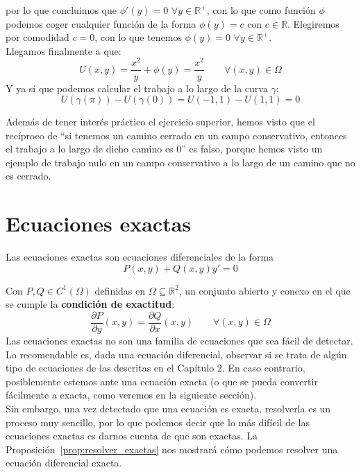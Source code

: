 \begin{ejercicio*}
    por lo que concluimos que $\phi'(y) = 0$ $\forall y\in \mathbb{R}^+$, con lo que como función $\phi$ podemos coger cualquier función de la forma $\phi(y) = c$ con $c\in \mathbb{R}$. Elegiremos por comodidad $c=0$, con lo que tenemos $\phi(y) = 0$ $\forall y\in \mathbb{R}^+$.\\

    Llegamos finalmente a que:
    \begin{equation*}
        U(x,y) = \dfrac{x^2}{y} + \phi(y) = \dfrac{x^2}{y} \qquad \forall (x,y)\in \Omega
    \end{equation*}
    Y ya sí que podemos calcular el trabajo a lo largo de la curva $\gamma$:
    \begin{equation*}
        U(\gamma(\pi)) - U(\gamma(0)) = U(-1,1) - U(1,1) = 0
    \end{equation*}
\end{ejercicio*}
Además de tener interés práctico el ejercicio superior, hemos visto que el recíproco de ``si tenemos un camino cerrado en un campo conservativo, entonces el trabajo a lo largo de dicho camino es 0'' es falso, porque hemos visto un ejemplo de trabajo nulo en un campo conservativo a lo largo de un camino que no es cerrado.

\section{Ecuaciones exactas}
Las ecuaciones exactas son ecuaciones diferenciales de la forma
\begin{equation}\label{eq:exacta}
    P(x,y)+Q(x,y)y' = 0
\end{equation}

Con $P,Q\in C^1(\Omega)$ definidas en $\Omega\subseteq \mathbb{R}^2$, un conjunto abierto y conexo en el que se cumple la \textbf{condición de exactitud}:
\begin{equation*}
    \dfrac{\partial P}{\partial y}(x,y) = \dfrac{\partial Q}{\partial x}(x,y) \qquad \forall (x,y)\in \Omega
\end{equation*}
Las ecuaciones exactas no son una familia de ecuaciones que sea fácil de detectar. Lo recomendable es, dada una ecuación diferencial, observar si se trata de algún tipo de ecuaciones de las descritas en el Capítulo 2. En caso contrario, posiblemente estemos ante una ecuación exacta (o que se pueda convertir fácilmente a exacta, como veremos en la siguiente sección).\\

Sin embargo, una vez detectado que una ecuación es exacta, resolverla es un proceso muy sencillo, por lo que podemos decir que lo más difícil de las ecuaciones exactas es darnos cuenta de que son exactas. La Proposición~\ref{prop:resolver_exactas} nos mostrará cómo podemos resolver una ecuación diferencial exacta.

